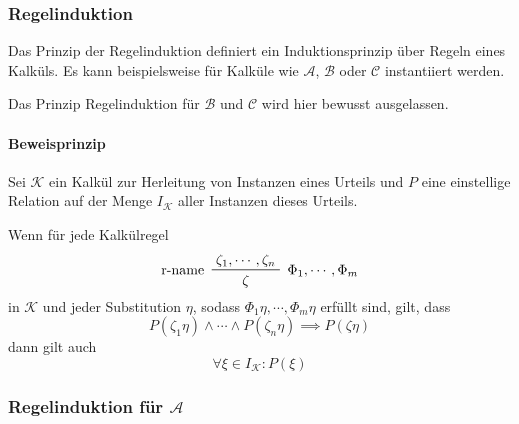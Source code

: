 			\subsubsection{Regelinduktion}
				Das Prinzip der Regelinduktion definiert ein Induktionsprinzip über Regeln eines Kalküls. Es kann beispielsweise für Kalküle wie $ \mathcal{A} $, $ \mathcal{B} $ oder $ \mathcal{C} $ instantiiert werden.

				Das Prinzip Regelinduktion für $ \mathcal{B} $ und $ \mathcal{C} $ wird hier bewusst ausgelassen.

				\paragraph{Beweisprinzip}
					Sei $ \mathcal{K} $ ein Kalkül zur Herleitung von Instanzen eines Urteils und $ P $ eine einstellige Relation auf der Menge $ I _ \mathcal{K} $ aller Instanzen dieses Urteils.

					Wenn für jede Kalkülregel
					\begin{equation*}
						\prftree[l, r]
						{ $ \Phi _ 1, \cdots, \Phi _ m $ }
						{ r-name }
						{ \zeta _ 1, \cdots, \zeta _ n }
						{ \zeta }
					\end{equation*}
					in $ \mathcal{K} $ und jeder Substitution $ \eta $, sodass $ \Phi _ 1 \eta, \cdots, \Phi _ m \eta $ erfüllt sind, gilt, dass
					\begin{equation*}
						P(\zeta _ 1 \eta) \land \cdots \land P(\zeta _ n \eta) \implies P(\zeta\eta)
					\end{equation*}
					dann gilt auch
					\begin{equation*}
						\forall \xi \in I _ \mathcal{K} : P(\xi)
					\end{equation*}

			\subsubsection{Regelinduktion für $ \mathcal{A} $}
